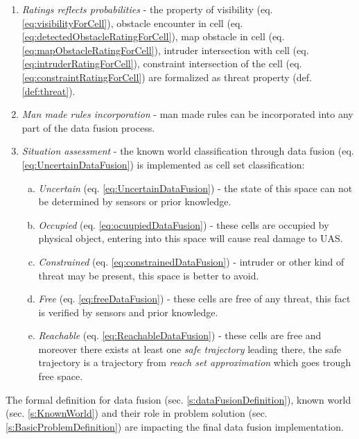 \begin{enumerate}
        \item \emph{Ratings reflects probabilities} - the property of visibility (eq. \ref{eq:visibilityForCell}), obstacle encounter in cell (eq. \ref{eq:detectedObstacleRatingForCell}), map obstacle in cell (eq. \ref{eq:mapObstacleRatingForCell}), intruder intersection with cell (eq. \ref{eq:intruderRatingForCell}), constraint intersection of the cell (eq. \ref{eq:constraintRatingForCell}) are formalized as threat property (def. \ref{def:threat}). 
	    
	    \item \emph{Man made rules incorporation} - man made rules can be incorporated into any part of the data fusion process.
	    
	    \item \emph{Situation assessment} - the known world classification through data fusion (eq. \ref{eq:UncertainDataFusion}) is implemented as cell set classification:
	    \begin{enumerate}[a.]
	        \item \emph{Uncertain} (eq. \ref{eq:UncertainDataFusion}) - the state of this space can not be determined by sensors or prior knowledge.
	        
	        \item \emph{Occupied} (eq. \ref{eq:ocuupiedDataFusion}) -  these cells are occupied by physical object, entering into this space will cause real damage to UAS.
	        
 	        \item \emph{Constrained} (eq. \ref{eq:constrainedDataFusion}) - intruder or other kind of threat may be present, this space is better to avoid.
 	        
	        \item \emph{Free} (eq. \ref{eq:freeDataFusion}) - these cells are free of any threat, this fact is verified by sensors and prior knowledge.
	        
	        \item \emph{Reachable} (eq. \ref{eq:ReachableDataFusion}) - these cells are free and moreover there exists at least one \emph{safe trajectory} leading there, the safe trajectory is a trajectory from \emph{reach set approximation} which goes trough free space.
	    \end{enumerate}
\end{enumerate}	    

\begin{note}
    The formal definition for data fusion (sec. \ref{s:dataFusionDefinition}), known world (sec. \ref{s:KnownWorld}) and their role in problem solution (sec. \ref{s:BasicProblemDefinition}) are impacting the final data fusion implementation.
\end{note}
	    

